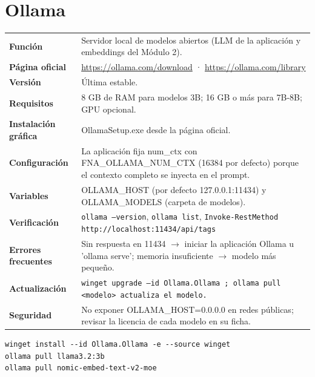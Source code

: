 \section{Ollama}
{\small\begin{tabularx}{\linewidth}{@{}>{\bfseries}p{2.9cm}X@{}}\toprule
Función & Servidor local de modelos abiertos (LLM de la aplicación y embeddings del Módulo 2).\\
Página oficial & \url{https://ollama.com/download} · \url{https://ollama.com/library}\\
Versión & Última estable.\\
Requisitos & 8 GB de RAM para modelos 3B; 16 GB o más para 7B-8B; GPU opcional.\\
Instalación gráfica & OllamaSetup.exe desde la página oficial.\\
Configuración & La aplicación fija num\_ctx con FNA\_OLLAMA\_NUM\_CTX (16384 por defecto) porque el contexto completo se inyecta en el prompt.\\
Variables & OLLAMA\_HOST (por defecto 127.0.0.1:11434) y OLLAMA\_MODELS (carpeta de modelos).\\
Verificación & \texttt{ollama --version}, \texttt{ollama list}, \texttt{Invoke-RestMethod http://localhost:11434/api/tags}\\
Errores frecuentes & Sin respuesta en 11434 $\rightarrow$ iniciar la aplicación Ollama u 'ollama serve'; memoria insuficiente $\rightarrow$ modelo más pequeño.\\
Actualización & \texttt{winget upgrade --id Ollama.Ollama ; ollama pull \textless{}modelo\textgreater{} actualiza el modelo.}\\
Seguridad & No exponer OLLAMA\_HOST=0.0.0.0 en redes públicas; revisar la licencia de cada modelo en su ficha.\\
\bottomrule\end{tabularx}}
\begin{lstlisting}[style=ps]
winget install --id Ollama.Ollama -e --source winget
ollama pull llama3.2:3b
ollama pull nomic-embed-text-v2-moe
\end{lstlisting}

